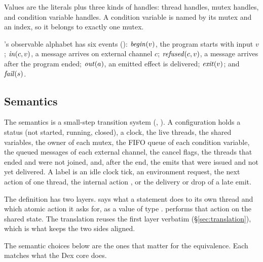 Values are the literals plus three kinds of handles: thread handles, mutex
handles, and condition variable handles. A condition variable is named by
its mutex and an index, so it belongs to exactly one mutex.

\Lang{}'s observable alphabet \ObsL{} has six events ():
$\mathit{begin}(v)$, the program starts with input $v$; $\mathit{in}(c, v)$, a
message arrives on external channel $c$; $\mathit{refused}(c, v)$, a message
arrives after the program ended; $\mathit{out}(a)$, an emitted effect is
delivered; $\mathit{exit}(v)$; and $\mathit{fail}(s)$.

\subsection{Semantics}
\label{sec:l-semantics}

The semantics is a small-step transition system (,
). A configuration holds a status (not started,
running, closed), a clock, the live threads, the shared variables, the owner
of each mutex, the FIFO queue of each condition variable, the queued
messages of each external channel, the cancel flags, the threads that ended
and were not joined, and, after the end, the emits that were issued and not
yet delivered. A label is an idle clock tick, an environment request, the
next action of one thread, the internal action , or the delivery or
drop of a late emit.

The definition has two layers.  says what a
statement does to its own thread and which atomic action it asks for, as a
value of type .  performs that action
on the shared state. The translation reuses the first layer verbatim
(\S\ref{sec:translation}), which is what keeps the two sides aligned.

The semantic choices below are the ones that matter for the equivalence.
Each matches what the Dex core does.

